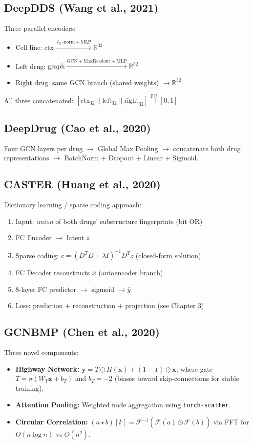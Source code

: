 \documentclass[12pt,a4paper,oneside]{book}
\begin{document}
\subsection{DeepDDS (Wang et al., 2021)}
Three parallel encoders:
\begin{itemize}
  \item Cell line: $\text{ctx} \xrightarrow{\ell_2\text{-norm} + \text{MLP}} \mathbb{R}^{32}$
  \item Left drug: $\text{graph} \xrightarrow{\text{GCN} + \text{MaxReadout} + \text{MLP}} \mathbb{R}^{32}$
  \item Right drug: same GCN branch (shared weights) $\to \mathbb{R}^{32}$
\end{itemize}
All three concatenated: $[\text{ctx}_{32} \| \text{left}_{32} \| \text{right}_{32}] \xrightarrow{\text{FC}} [0,1]$

\subsection{DeepDrug (Cao et al., 2020)}
Four GCN layers per drug $\to$ Global Max Pooling $\to$ concatenate both drug representations $\to$ BatchNorm + Dropout + Linear + Sigmoid.

\subsection{CASTER (Huang et al., 2020)}
Dictionary learning / sparse coding approach:
\begin{enumerate}
  \item Input: \textit{union} of both drugs' substructure fingerprints (bit OR)
  \item FC Encoder $\to$ latent $z$
  \item Sparse coding: $c = (D^TD + \lambda I)^{-1} D^T z$ (closed-form solution)
  \item FC Decoder reconstructs $\hat{x}$ (autoencoder branch)
  \item 8-layer FC predictor $\to$ sigmoid $\to \hat{y}$
  \item Loss: prediction + reconstruction + projection (see Chapter 3)
\end{enumerate}

\subsection{GCNBMP (Chen et al., 2020)}
Three novel components:
\begin{itemize}
  \item \textbf{Highway Network:} $\mathbf{y} = T \odot H(\mathbf{x}) + (1-T) \odot \mathbf{x}$, where gate $T = \sigma(W_T \mathbf{x} + b_T)$ and $b_T = -2$ (biases toward skip-connections for stable training).
  \item \textbf{Attention Pooling:} Weighted node aggregation using \texttt{torch-scatter}.
  \item \textbf{Circular Correlation:} $(a\star b)[k] = \mathcal{F}^{-1}(\overline{\mathcal{F}(a)} \odot \mathcal{F}(b))$ via FFT for $O(n\log n)$ vs $O(n^2)$.
\end{itemize}
\end{document}
